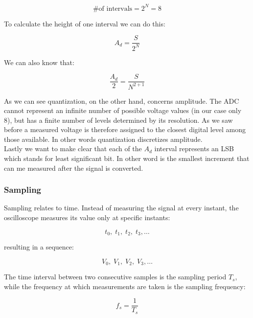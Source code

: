 \documentclass[../main.tex]{subfiles}
\begin{document}
\begin{equation}
	\text{\# of intervals} = 2^N = 8
\end{equation}

To calculate the height of one interval we can do this:

\begin{equation}
	A_d = \frac{S}{2^N} 
\end{equation}

We can also know that:

\begin{equation}
	\frac{A_d}{2} = \frac{S}{N^{2+1}}
\end{equation}

As we can see quantization, on the other hand, concerns amplitude. 
The ADC cannot represent an infinite number of possible voltage values (in our case only 8), but has a finite number of levels determined by its resolution. As we saw before a measured voltage is therefore assigned to the closest digital level among those available. In other words quantization discretizes amplitude.\\

Lastly we want to make clear that each of the $A_d$ interval represents an LSB which stands for least significant bit. In other word is the smallest increment that can me measured after the signal is converted.\\

\subsubsection{Sampling}

Sampling relates to time. Instead of measuring the signal at every instant, the oscilloscope measures its value only at specific instants:

\begin{equation}
	t_0,\; t_1, \;t_2, \;t_3,\ldots	
\end{equation}

resulting in a sequence:

\begin{equation}
	V_0,\;V_1,\;V_2,\;V_3,\ldots
\end{equation}

The time interval between two consecutive samples is the sampling period $T_s$, while the frequency at which measurements are taken is the sampling frequency:

\begin{equation}
	f_s=\frac{1}{T_s}
\end{equation}
\end{document}

